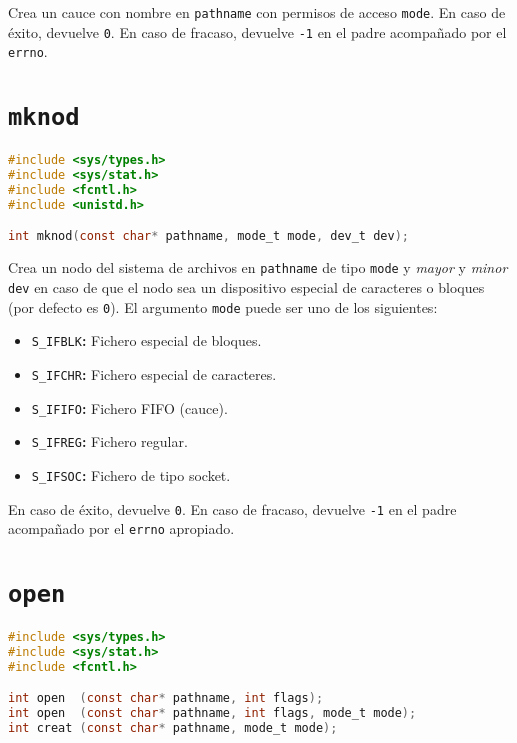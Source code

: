 Crea un cauce con nombre en \texttt{pathname} con permisos de acceso \texttt{mode}.
En caso de éxito, devuelve \texttt{0}.
En caso de fracaso, devuelve \texttt{-1} en el padre acompañado por el \texttt{errno}.

\section{\texttt{mknod}}\label{mknod}

\begin{lstlisting}[language=C]
#include <sys/types.h>
#include <sys/stat.h>
#include <fcntl.h>
#include <unistd.h>

int mknod(const char* pathname, mode_t mode, dev_t dev);
\end{lstlisting}

Crea un nodo del sistema de archivos en \texttt{pathname} de tipo \texttt{mode} y \emph{mayor} y \emph{minor} \texttt{dev} en caso de que el nodo sea un dispositivo especial de caracteres o bloques (por defecto es \texttt{0}).
El argumento \texttt{mode} puede ser uno de los siguientes:

\begin{itemize}
	\item\texttt{S\_IFBLK}\textbf{:} Fichero especial de bloques.
	\item\texttt{S\_IFCHR}\textbf{:} Fichero especial de caracteres.
	\item\texttt{S\_IFIFO}\textbf{:} Fichero FIFO (cauce).
	\item\texttt{S\_IFREG}\textbf{:} Fichero regular.
	\item\texttt{S\_IFSOC}\textbf{:} Fichero de tipo socket.
\end{itemize}

En caso de éxito, devuelve \texttt{0}.
En caso de fracaso, devuelve \texttt{-1} en el padre acompañado por el \texttt{errno} apropiado.

\section{\texttt{open}}\label{open}

\begin{lstlisting}[language=C]
#include <sys/types.h>
#include <sys/stat.h>
#include <fcntl.h>

int open  (const char* pathname, int flags);
int open  (const char* pathname, int flags, mode_t mode);
int creat (const char* pathname, mode_t mode);
\end{lstlisting}

